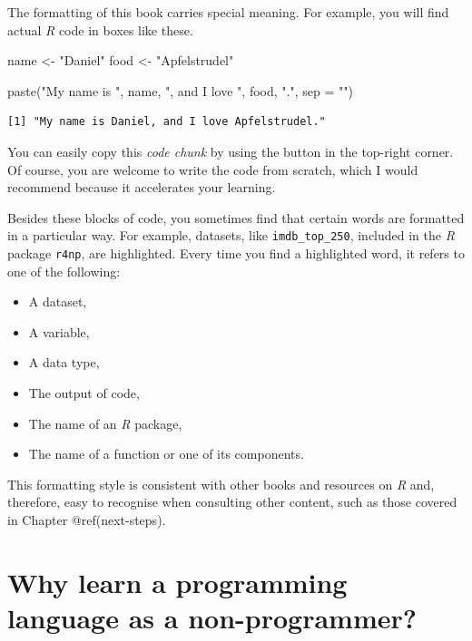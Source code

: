 \documentclass[
  letterpaper,
]{krantz}
\makeatletter
\newenvironment{Shaded}{\begin{snugshade}}{\end{snugshade}}
\newcommand{\AttributeTok}[1]{\textcolor[rgb]{0.40,0.45,0.13}{#1}}
\newcommand{\FunctionTok}[1]{\textcolor[rgb]{0.28,0.35,0.67}{#1}}
\newcommand{\NormalTok}[1]{\textcolor[rgb]{0.00,0.23,0.31}{#1}}
\newcommand{\OtherTok}[1]{\textcolor[rgb]{0.00,0.23,0.31}{#1}}
\newcommand{\StringTok}[1]{\textcolor[rgb]{0.13,0.47,0.30}{#1}}
\newenvironment{kframe}{%
\medskip{}
\setlength{\fboxsep}{.8em}
 \def\at@end@of@kframe{}%
 \ifinner\ifhmode%
  \def\at@end@of@kframe{\end{minipage}}%
  \begin{minipage}{\columnwidth}%
 \fi\fi%
 \def\FrameCommand##1{\hskip\@totalleftmargin \hskip-\fboxsep
 \colorbox{shadecolor}{##1}\hskip-\fboxsep
     \hskip-\linewidth \hskip-\@totalleftmargin \hskip\columnwidth}%
 \MakeFramed {\advance\hsize-\width
   \@totalleftmargin\z@ \linewidth\hsize
   \@setminipage}}%
 {\par\unskip\endMakeFramed%
 \at@end@of@kframe}
\renewenvironment{Shaded}{\begin{kframe}}{\end{kframe}}
\makeatother
\begin{document}
The formatting of this book carries special meaning. For example, you
will find actual \emph{R} code in boxes like these.

\begin{Shaded}
\begin{Highlighting}[]
\NormalTok{name }\OtherTok{\textless{}{-}} \StringTok{"Daniel"}
\NormalTok{food }\OtherTok{\textless{}{-}} \StringTok{"Apfelstrudel"}

\FunctionTok{paste}\NormalTok{(}\StringTok{"My name is "}\NormalTok{, name, }\StringTok{", and I love "}\NormalTok{, food, }\StringTok{"."}\NormalTok{, }\AttributeTok{sep =} \StringTok{""}\NormalTok{)}
\end{Highlighting}
\end{Shaded}

\begin{verbatim}
[1] "My name is Daniel, and I love Apfelstrudel."
\end{verbatim}

You can easily copy this \emph{code chunk} by using the button in the
top-right corner. Of course, you are welcome to write the code from
scratch, which I would recommend because it accelerates your learning.

Besides these blocks of code, you sometimes find that certain words are
formatted in a particular way. For example, datasets, like
\texttt{imdb\_top\_250}, included in the \emph{R} package \texttt{r4np},
are highlighted. Every time you find a highlighted word, it refers to
one of the following:

\begin{itemize}
\item
  A dataset,
\item
  A variable,
\item
  A data type,
\item
  The output of code,
\item
  The name of an \emph{R} package,
\item
  The name of a function or one of its components.
\end{itemize}

This formatting style is consistent with other books and resources on
\emph{R} and, therefore, easy to recognise when consulting other
content, such as those covered in Chapter @ref(next-steps).


\chapter{Why learn a programming language as a
non-programmer?}\label{why-learn-a-programming-language-as-a-non-programmer}
\end{document}
